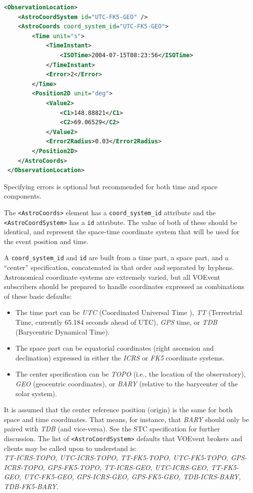\documentclass[11pt,a4paper]{ivoa}
\begin{document}
\begin{lstlisting}[language=XML]
<ObservationLocation>
    <AstroCoordSystem id="UTC-FK5-GEO" />
    <AstroCoords coord_system_id="UTC-FK5-GEO">
        <Time unit="s">
            <TimeInstant>
                <ISOTime>2004-07-15T08:23:56</ISOTime>
            </TimeInstant>
            <Error>2</Error>
        </Time>
        <Position2D unit="deg">
            <Value2>
                <C1>148.88821</C1>
                <C2>69.06529</C2>
            </Value2>
            <Error2Radius>0.03</Error2Radius>
        </Position2D>
    </AstroCoords>
 </ObservationLocation> 
\end{lstlisting}

Specifying errors is optional but recommended for both time and space components. 

The {\tt <AstroCoords>} element has a {\tt coord\_system\_id} attribute and the {\tt <AstroCoordSystem>} has a {\tt id} attribute. The value of both of these should be identical, and represent the space-time coordinate system that will be used for the event position and time. 

A {\tt coord\_system\_id} and {\tt id} are built from a time part, a space part, and a ``center'' specification, concatenated in that order and separated by hyphens. Astronomical coordinate systems are extremely varied, but all VOEvent subscribers should be prepared to handle coordinates expressed as combinations of these basic defaults: 
\begin{itemize}
\item The time part can be \emph{UTC} (Coordinated Universal Time \citep{bib26}), \emph{TT} (Terrestrial Time, currently 65.184 seconds ahead of UTC), \emph{GPS} time, or \emph{TDB} (Barycentric Dynamical Time). 
\item The space part can be equatorial coordinates (right ascension and declination) expressed in either the \emph{ICRS} or \emph{FK5} coordinate systems. 
\item The center specification can be \emph{TOPO} (i.e., the location of the observatory), \emph{GEO} (geocentric coordinates), or \emph{BARY} (relative to the barycenter of the solar system). 
\end{itemize}


It is assumed that the center reference position (origin) is the same for both space and time coordinates. That means, for instance, that \emph{BARY} should only be paired with \emph{TDB} (and vice-versa). See the STC specification \citep{2007ivoa.spec.1030R} %
for further discussion. The list of {\tt <AstroCoordSystem>} defaults that VOEvent brokers and clients may be called upon to understand is: \\
\emph{TT-ICRS-TOPO, UTC-ICRS-TOPO, TT-FK5-TOPO, UTC-FK5-TOPO, GPS-ICRS-TOPO, GPS-FK5-TOPO, TT-ICRS-GEO, UTC-ICRS-GEO, TT-FK5-GEO, UTC-FK5-GEO, GPS-ICRS-GEO, GPS-FK5-GEO, TDB-ICRS-BARY, TDB-FK5-BARY}. 
\end{document}
